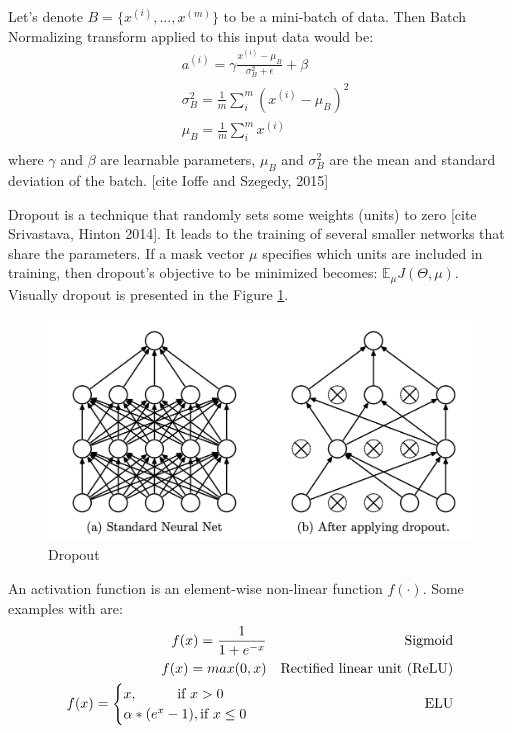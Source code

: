 \begin{definition}
	Let's denote $B = \{x^{(i)}, ..., x^{(m)}\}$ to be a mini-batch of data. Then Batch Normalizing transform applied to this input data would be:
	\begin{equation}
		\begin{split}
		& a^{(i)} = \gamma \frac{x^{(i)} - \mu_B}{\sigma^2_B + \epsilon} + \beta \\
		& \sigma^2_B = \frac{1}{m} \sum_i^m (x^{(i)} - \mu_B)^2 \\
		& \mu_B = \frac{1}{m} \sum_i^m x^{(i)} \\
		\end{split}
	\end{equation}
	where $\gamma$ and $\beta$ are learnable parameters, $\mu_B$ and $\sigma^2_B$ are the mean and standard deviation of the batch.
	[cite Ioffe and Szegedy, 2015]
\end{definition}

\begin{definition}
	Dropout is a technique that randomly sets some weights (units) to zero [cite Srivastava, Hinton 2014]. It leads to the training of several smaller networks that share the parameters. If a mask vector $\mu$ specifies which units are included in training, then dropout's objective to be minimized becomes: $\mathbb{E}_\mu J(\Theta, \mu)$. Visually dropout is presented in the Figure \ref{fig:dropout}.
\end{definition}

\begin{figure}[H]
	\begin{center}
		\includegraphics[width=0.5\linewidth]{bilder/dropout.png}
		\caption{Dropout}\label{fig:dropout}
	\end{center}
\end{figure}

\begin{definition}
	An activation function is an element-wise non-linear function $f(\cdot)$. Some examples with are:
	\begin{align}             
		f(x) = \frac{1}{1 + e^{-x}} &&\text{Sigmoid} \\      
		f(x) = max(0, x) &&\text{Rectified linear unit (ReLU)}\\
		f(x) = \begin{cases}
				x, \hspace*{1cm} \textrm{if } x > 0 \\
				\alpha * (e^{x} - 1), \textrm{if }  x \leq 0
		  	\end{cases}\ &&\text{ELU}
		\end{align}
\end{definition}

